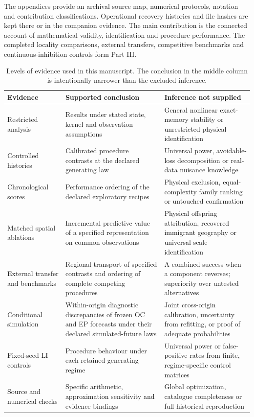 The appendices provide an archival source map, numerical protocols, notation and contribution classifications. Operational recovery histories and file hashes are kept there or in the companion evidence. The main contribution is the connected account of mathematical validity, identification and procedure performance. The completed locality comparisons, external transfers, competitive benchmarks and continuous-inhibition controls form Part III.

\begin{table}[!htbp]
\centering
\small
\caption{Levels of evidence used in this manuscript. The conclusion in the middle column is intentionally narrower than the excluded inference.}
\label{tab:evidence_levels}
\begin{tabularx}{\textwidth}{@{}>{\raggedright\arraybackslash}p{}>{\raggedright\arraybackslash}X>{\raggedright\arraybackslash}X@{}}
\toprule
Evidence & Supported conclusion & Inference not supplied \\
\midrule
Restricted analysis & Results under stated state, kernel and observation assumptions & General nonlinear exact-memory stability or unrestricted physical identification \\
Controlled histories & Calibrated procedure contrasts at the declared generating law & Universal power, avoidable-loss decomposition or real-data nuisance knowledge \\
Chronological scores & Performance ordering of the declared exploratory recipes & Physical exclusion, equal-complexity family ranking or untouched confirmation \\
Matched spatial ablations & Incremental predictive value of a specified representation on common observations & Physical offspring attribution, recovered immigrant geography or universal scale identification \\
External transfer and benchmarks & Regional transport of specified contrasts and ordering of complete competing procedures & A combined success when a component reverses; superiority over untested alternatives \\
Conditional simulation & Within-origin diagnostic discrepancies of frozen OC and EP forecasts under their declared simulated-future laws & Joint cross-origin calibration, uncertainty from refitting, or proof of adequate probabilities \\
Fixed-seed LI controls & Procedure behaviour under each retained generating regime & Universal power or false-positive rates from finite, regime-specific control matrices \\
Source and numerical checks & Specific arithmetic, approximation sensitivity and evidence bindings & Global optimization, catalogue completeness or full historical reproduction \\
\bottomrule
\end{tabularx}
\end{table}
